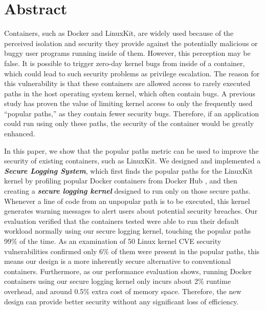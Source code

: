 \section*{Abstract}
Containers, such as Docker and LinuxKit, are widely used because of the perceived isolation and security 
they provide against the potentially malicious or buggy user programs running inside of them. 
However, this perception may be false. It is possible to trigger zero-day kernel bugs from inside of a container, 
which could lead to such security problems  as privilege escalation.  
The reason for this vulnerability is that these containers are allowed access to rarely executed paths in the host operating system kernel, 
which often contain bugs. A previous study \cite{Lock-in-Pop} has proven the value of limiting kernel access to 
only the frequently used ``popular paths,'' as they contain fewer security bugs. 
Therefore, if an application could run using only these paths, the security of the container would be greatly enhanced. 

In this paper, we show that the popular paths metric can be used to improve the security of existing containers, such as LinuxKit. 
We designed and implemented a \textbf{\textit{Secure Logging System}}, which first finds the popular paths for the LinuxKit kernel 
by profiling popular Docker containers from Docker Hub \cite{DockerHub}, 
and then creating a \textbf{\textit{secure logging kernel}} designed to run 
only on those secure paths. Whenever a line of code from an unpopular path is to be executed, this kernel generates warning messages 
to alert users about potential security breaches. 
Our evaluation verified that the containers tested were able to run their default workload normally using our secure logging kernel, 
touching the popular paths 99\% of the time. 
As an examination of 50 Linux kernel CVE security vulnerabilities confirmed only 6\% of them were present in the popular paths, 
this means our design is a more inherently secure alternative to conventional containers. 
Furthermore, as our performance evaluation shows, running Docker containers using our secure logging kernel 
only incurs about 2\% runtime overhead, and around 0.5\% extra cost of memory space. 
Therefore, the new design can provide better security without any significant loss of efficiency.